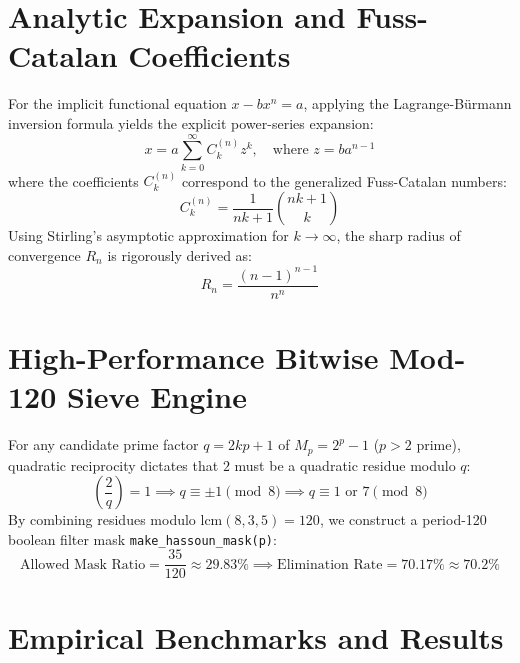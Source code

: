 \documentclass[12pt,a4paper]{article}
\begin{document}
\section{Analytic Expansion and Fuss-Catalan Coefficients}
For the implicit functional equation $x - b x^n = a$, applying the Lagrange-B\"urmann inversion formula yields the explicit power-series expansion:
\begin{equation}
x = a \sum_{k=0}^{\infty} C_k^{(n)} z^k, \quad \text{where } z = b a^{n-1}
\end{equation}
where the coefficients $C_k^{(n)}$ correspond to the generalized Fuss-Catalan numbers:
\begin{equation}
C_k^{(n)} = \frac{1}{n k + 1} \binom{n k + 1}{k}
\end{equation}
Using Stirling's asymptotic approximation for $k \to \infty$, the sharp radius of convergence $R_n$ is rigorously derived as:
\begin{equation}
R_n = \frac{(n-1)^{n-1}}{n^n}
\end{equation}

\section{High-Performance Bitwise Mod-120 Sieve Engine}
For any candidate prime factor $q = 2kp + 1$ of $M_p = 2^p - 1$ ($p > 2$ prime), quadratic reciprocity dictates that $2$ must be a quadratic residue modulo $q$:
\begin{equation}
\left(\frac{2}{q}\right) = 1 \implies q \equiv \pm 1 \pmod 8 \implies q \equiv 1 \text{ or } 7 \pmod 8
\end{equation}
By combining residues modulo $\text{lcm}(8, 3, 5) = 120$, we construct a period-120 boolean filter mask \texttt{make\_hassoun\_mask(p)}:
\begin{equation}
\text{Allowed Mask Ratio} = \frac{35}{120} \approx 29.83\% \implies \text{Elimination Rate} = 70.17\% \approx 70.2\%
\end{equation}

\section{Empirical Benchmarks and Results}
\end{document}
